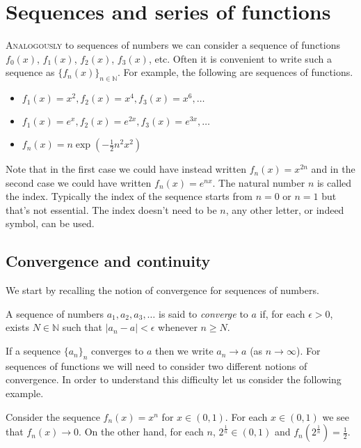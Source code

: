 \chapter{Sequences and series of functions}

\lettrine{A}{nalogously} to sequences of numbers we can consider a sequence of functions \(f_0(x)\), \(f_1(x)\), \(f_2(x)\), \(f_3(x)\), etc.
Often it is convenient to write such a sequence as \({\{ f_n(x)\}}_{n\in \mathbb{N}}\).
For example, the following are sequences of functions.
\begin{itemize}
  \item \(f_1(x) = x^2, f_2(x)=x^4, f_3(x)=x^6,\ldots \)
  \item \(f_1(x) = e^x, f_2(x)=e^{2x}, f_3(x)=e^{3x},\ldots \)
  \item \(f_n(x) = n \exp \left( - \frac{1}{2}n^2 x^2 \right)\)
\end{itemize}

Note that in the first case we could have instead written \(f_n(x) = x^{2n}\) and in the second case we could have written  \(f_n(x) = e^{nx}\).
The natural number \(n\) is called the index.
Typically the index of the sequence starts from \(n=0\) or \(n=1\) but that's not essential.
The index doesn't need to be \(n\), any other letter, or indeed symbol, can be used.


\section{Convergence and continuity}

We start by recalling the notion of convergence for sequences of numbers.

\begin{definition}
  A sequence of numbers  \(a_1, a_2, a_3,\ldots \) is said to \emph{converge} to \(a\) if, for each \(\epsilon>0\), exists \(N\in \mathbb{N}\) such that \(|a_n - a| < \epsilon\) whenever \(n\geq N\).
\end{definition}
%
\noindent
If a sequence \({\{a_n\}}_{n}\) converges to \(a\) then we write \(a_n \to a\) (as \(n\to \infty\)).
For sequences of functions we will need to consider two different notions of convergence.
In order to understand this difficulty let us consider the following example.

\begin{example*}
  Consider the sequence \(f_n(x) = x^n\) for \(x\in (0,1)\).
  For each \(x\in (0,1)\) we see that \(f_n(x) \to 0\).
  On the other hand, for each \(n\), \(2^{\frac{1}{n}}\in (0,1)\) and \(f_n(2^{\frac{1}{n}}) = \frac{1}{2}\).
\end{example*}


